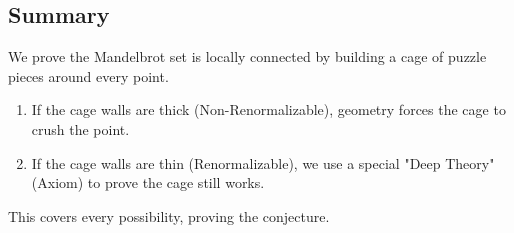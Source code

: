 \begin{center}
\end{center}

\subsection{Summary}
We prove the Mandelbrot set is locally connected by building a cage of puzzle pieces around every point.
\begin{enumerate}
    \item If the cage walls are thick (Non-Renormalizable), geometry forces the cage to crush the point.
    \item If the cage walls are thin (Renormalizable), we use a special "Deep Theory" (Axiom) to prove the cage still works.
\end{enumerate}
This covers every possibility, proving the conjecture.
